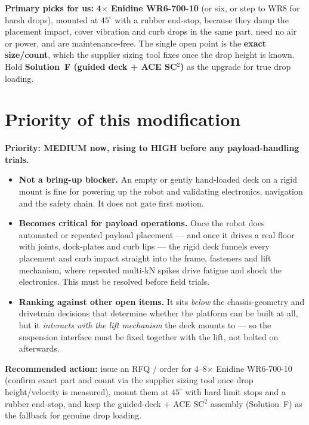 \documentclass[11pt,a4paper]{article}
\newcommand{\prio}[1]{\colorbox{amber}{\parbox{\dimexpr\linewidth-2\fboxsep}{#1}}}
\begin{document}
\noindent\textbf{Primary picks for us:} \textbf{4$\times$ Enidine WR6-700-10} (or six, or step to WR8 for
harsh drops), mounted at $45^{\circ}$ with a rubber end-stop, because they damp the placement impact,
cover vibration and curb drops in the same part, need no air or power, and are maintenance-free. The
single open point is the \textbf{exact size/count}, which the supplier sizing tool fixes once the drop
height is known. Hold \textbf{Solution~F (guided deck + ACE SC$^2$)} as the upgrade for true drop loading.

\section{Priority of this modification}
\prio{\textbf{Priority: MEDIUM now, rising to HIGH before any payload-handling trials.}}

\begin{itemize}
\item \textbf{Not a bring-up blocker.} An empty or gently hand-loaded deck on a rigid mount is fine for
powering up the robot and validating electronics, navigation and the safety chain. It does not gate first
motion.
\item \textbf{Becomes critical for payload operations.} Once the robot does automated or repeated payload
placement --- and once it drives a real floor with joints, dock-plates and curb lips --- the rigid deck
funnels every placement and curb impact straight into the frame, fasteners and lift mechanism, where
repeated multi-kN spikes drive fatigue and shock the electronics. This must be resolved before field
trials.
\item \textbf{Ranking against other open items.} It sits \emph{below} the chassis-geometry and drivetrain
decisions that determine whether the platform can be built at all, but it \emph{interacts with the lift
mechanism} the deck mounts to --- so the suspension interface must be fixed together with the lift, not
bolted on afterwards.
\end{itemize}

\noindent\textbf{Recommended action:} issue an RFQ / order for 4--8$\times$ Enidine WR6-700-10 (confirm
exact part and count via the supplier sizing tool once drop height/velocity is measured), mount them at
$45^{\circ}$ with hard limit stops and a rubber end-stop, and keep the guided-deck + ACE SC$^2$ assembly
(Solution~F) as the fallback for genuine drop loading.
\end{document}

